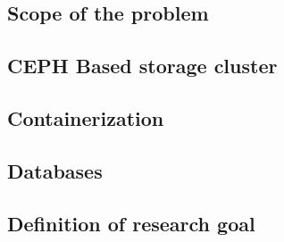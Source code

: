 \documentclass[titlepage, a4paper, 11pt]{scrartcl}
\begin{document}
        \subsection{Scope of the problem}



 



        \subsection{CEPH Based storage cluster}


        \subsection{Containerization}


        \subsection{Databases}


        \subsection{Definition of research goal}        
\end{document}
